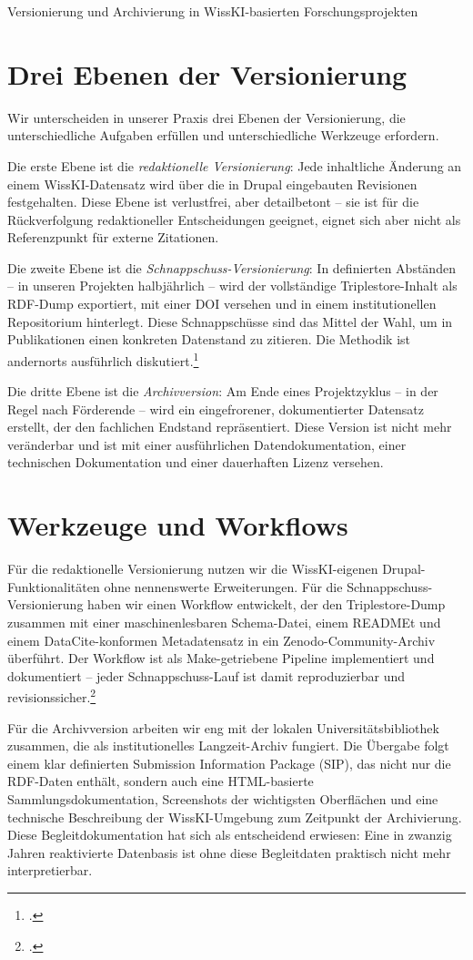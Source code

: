 \begin{beitrag}{Versionierung und Archivierung in WissKI-basierten Forschungsprojekten}
\section{Drei Ebenen der Versionierung}
Wir unterscheiden in unserer Praxis drei Ebenen der Versionierung, die unterschiedliche Aufgaben erfüllen und unterschiedliche Werkzeuge erfordern.

Die erste Ebene ist die \emph{redaktionelle Versionierung}: Jede inhaltliche Änderung an einem WissKI-Datensatz wird über die in Drupal eingebauten Revisionen festgehalten. Diese Ebene ist verlustfrei, aber detailbetont -- sie ist für die Rückverfolgung redaktioneller Entscheidungen geeignet, eignet sich aber nicht als Referenzpunkt für externe Zitationen.

Die zweite Ebene ist die \emph{Schnappschuss-Versionierung}: In definierten Abständen -- in unseren Projekten halbjährlich -- wird der vollständige Triplestore-Inhalt als RDF-Dump exportiert, mit einer DOI versehen und in einem institutionellen Repositorium hinterlegt. Diese Schnappschüsse sind das Mittel der Wahl, um in Publikationen einen konkreten Datenstand zu zitieren. Die Methodik ist andernorts ausführlich diskutiert.\footcite[94]{moeller2024-snapshots}

Die dritte Ebene ist die \emph{Archivversion}: Am Ende eines Projektzyklus -- in der Regel nach Förderende -- wird ein eingefrorener, dokumentierter Datensatz erstellt, der den fachlichen Endstand repräsentiert. Diese Version ist nicht mehr veränderbar und ist mit einer ausführlichen Datendokumentation, einer technischen Dokumentation und einer dauerhaften Lizenz versehen.

\section{Werkzeuge und Workflows}
Für die redaktionelle Versionierung nutzen wir die WissKI-eigenen Drupal-Funktionalitäten ohne nennenswerte Erweiterungen. Für die Schnappschuss-Versionierung haben wir einen Workflow entwickelt, der den Triplestore-Dump zusammen mit einer maschinenlesbaren Schema-Datei, einem READMEt und einem DataCite-konformen Metadatensatz in ein Zenodo-Community-Archiv überführt. Der Workflow ist als Make-getriebene Pipeline implementiert und dokumentiert -- jeder Schnappschuss-Lauf ist damit reproduzierbar und revisionssicher.\footcite[vgl.][128]{neumann2025-archivierung}

Für die Archivversion arbeiten wir eng mit der lokalen Universitätsbibliothek zusammen, die als institutionelles Langzeit-Archiv fungiert. Die Übergabe folgt einem klar definierten Submission Information Package (SIP), das nicht nur die RDF-Daten enthält, sondern auch eine HTML-basierte Sammlungsdokumentation, Screenshots der wichtigsten Oberflächen und eine technische Beschreibung der WissKI-Umgebung zum Zeitpunkt der Archivierung. Diese Begleitdokumentation hat sich als entscheidend erwiesen: Eine in zwanzig Jahren reaktivierte Datenbasis ist ohne diese Begleitdaten praktisch nicht mehr interpretierbar.


\end{beitrag}
